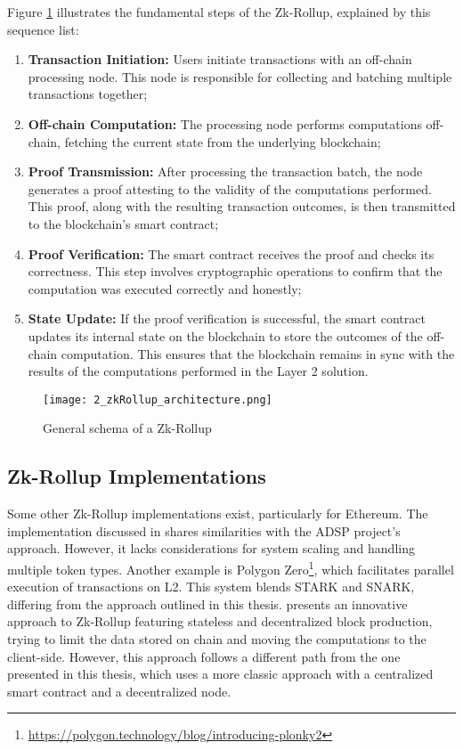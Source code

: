 Figure \ref{fig:3_zkRollup_schema} illustrates the fundamental steps of the Zk-Rollup, explained by this sequence list:
\begin{enumerate}
  \item \textbf{Transaction Initiation:} Users initiate transactions with an off-chain processing node. This node is responsible for collecting and batching multiple transactions together;
  \item \textbf{Off-chain Computation:} The processing node performs computations off-chain, fetching the current state from the underlying blockchain;
  \item \textbf{Proof Transmission:} After processing the transaction batch, the node generates a proof attesting to the validity of the computations performed. This proof, along with the resulting transaction outcomes, is then transmitted to the blockchain's smart contract;
  \item \textbf{Proof Verification:} The smart contract receives the proof and checks its correctness. This step involves cryptographic operations to confirm that the computation was executed correctly and honestly;
  \item \textbf{State Update:} If the proof verification is successful, the smart contract updates its internal state on the blockchain to store the outcomes of the off-chain computation. This ensures that the blockchain remains in sync with the results of the computations performed in the Layer 2 solution.
\end{enumerate}

\begin{figure}[ht]
  \centering
  \texttt{[image: 2\_zkRollup\_architecture.png]}
  \caption[Zk-Rollup Schema]{General schema of a Zk-Rollup\cite{ise_department_tub_material_nodate}}  
  \label{fig:3_zkRollup_schema}
\end{figure}

\subsection{Zk-Rollup Implementations}
Some other Zk-Rollup implementations exist, particularly for Ethereum. The implementation discussed in \cite{dinh_implementation_2023} shares similarities with the ADSP project's approach. However, it lacks considerations for system scaling and handling multiple token types. Another example is Polygon Zero\footnote{\url{https://polygon.technology/blog/introducing-plonky2}}, which facilitates parallel execution of transactions on L2. This system blends STARK and SNARK, differing from the approach outlined in this thesis. \cite{rybakken_intmax2_2023} presents an innovative approach to Zk-Rollup featuring stateless and decentralized block production, trying to limit the data stored on chain and moving the computations to the client-side. However, this approach follows a different path from the one presented in this thesis, which uses a more classic approach with a centralized smart contract and a decentralized node.

